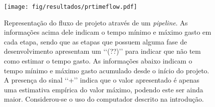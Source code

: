 \documentclass[11pt,a4paper,oneside]{book}
\begin{document}
\begin{figure}[htp]
\centering
\texttt{[image: fig/resultados/prtimeflow.pdf]}
\caption{Representação do fluxo de projeto através de um \textit{pipeline}. As informações acima dele indicam o tempo mínimo e máximo gasto em cada etapa, sendo que as etapas que possuem alguma fase de desenvolvimento apresentam um \lq\lq{}(??)\rq\rq{} para indicar que não tem como estimar o tempo gasto. As informações abaixo indicam o tempo mínimo e máximo gasto acumulado desde o início do projeto. A presença do sinal \lq\lq{}+\rq\rq{} indica que o valor apresentado é apenas uma estimativa empírica do valor máximo, podendo este ser ainda maior. Considerou-se o uso do computador descrito na introdução.}
\label{fig:res:prtimeflow}
\end{figure}

\ifx\compilewholereport\undefined
	
	\newsavebox\mytempbib\savebox\mytempbib{\parbox{\textwidth}{}}

	\listoftodos
	
\end{document}
